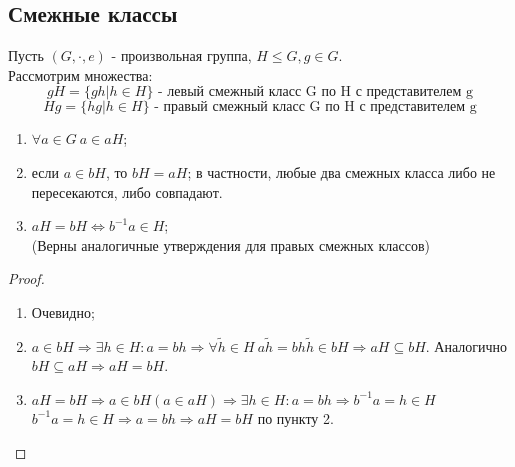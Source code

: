 \subsection{Смежные классы}
\begin{definition}
    Пусть $(G, \cdot, e)$ - произвольная группа, $H \leqslant G, g \in G$.\\
    Рассмотрим множества:
    \[gH = \{gh | h \in H\} \text{ - левый смежный класс G по H с представителем g}\]
    \[Hg = \{hg | h \in H\} \text{ - правый смежный класс G по H с представителем g}\]
\end{definition}
\begin{subtheorem} \tab
    \begin{enumerate}
        \item $\forall a \in G \ a \in aH$;
        \item если $a \in bH$, то $bH = aH$; в частности, любые два смежных класса либо не пересекаются, либо совпадают.
        \item $aH = bH \Longleftrightarrow b^{-1}a \in H$;\\
        (Верны аналогичные утверждения для правых смежных классов)
    \end{enumerate}
\end{subtheorem}
\begin{proof} \tab
    \begin{enumerate}
        \item Очевидно;
        \item $a \in bH \Longrightarrow \exists h \in H: a = bh \Longrightarrow \forall \tilde{h} \in H \ a\tilde{h} = bh\tilde{h} \in bH \Longrightarrow aH \subseteq bH$.
        Аналогично $bH \subseteq aH \Longrightarrow aH = bH$.
        \item $aH = bH \Longrightarrow a \in bH (a \in aH) \Longrightarrow \exists h \in H: a = bh \Longrightarrow b^{-1}a = h \in H$\\
        $b^{-1}a = h \in H \Longrightarrow a = bh \Longrightarrow aH = bH$ по пункту 2.
    \end{enumerate}
\end{proof}